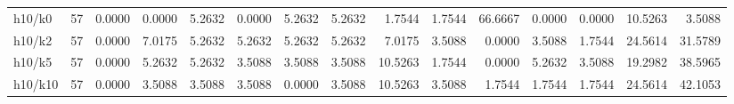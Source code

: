 \begin{tabular}{lrrrrrrrrrrrrrr}
h10/k0 & 57 & 0.0000 & 0.0000 & 5.2632 & 0.0000 & 5.2632 & 5.2632 & 1.7544 & 1.7544 & 66.6667 & 0.0000 & 0.0000 & 10.5263 & 3.5088 \\
h10/k2 & 57 & 0.0000 & 7.0175 & 5.2632 & 5.2632 & 5.2632 & 5.2632 & 7.0175 & 3.5088 & 0.0000 & 3.5088 & 1.7544 & 24.5614 & 31.5789 \\
h10/k5 & 57 & 0.0000 & 5.2632 & 5.2632 & 3.5088 & 3.5088 & 3.5088 & 10.5263 & 1.7544 & 0.0000 & 5.2632 & 3.5088 & 19.2982 & 38.5965 \\
h10/k10 & 57 & 0.0000 & 3.5088 & 3.5088 & 3.5088 & 0.0000 & 3.5088 & 10.5263 & 3.5088 & 1.7544 & 1.7544 & 1.7544 & 24.5614 & 42.1053 \\
\bottomrule
\end{tabular}
